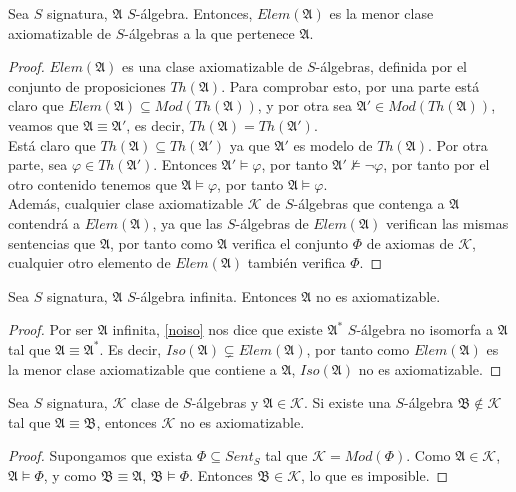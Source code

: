 \begin{theorem}
Sea $S$ signatura, $\mathfrak{A}$ $S$-álgebra. Entonces, $Elem(\mathfrak{A})$ es la menor clase axiomatizable de $S$-álgebras a la que pertenece $\mathfrak{A}$.
\end{theorem}
\begin{proof}
$Elem(\mathfrak{A})$ es una clase axiomatizable de $S$-álgebras, definida por el conjunto de proposiciones $Th(\mathfrak{A})$. Para comprobar esto, por una parte está claro que $Elem(\mathfrak{A})\subseteq Mod(Th(\mathfrak{A}))$, y por otra sea $\mathfrak{A}'\in Mod(Th(\mathfrak{A}))$, veamos que $\mathfrak{A}\equiv\mathfrak{A}'$, es decir, $Th(\mathfrak{A})=Th(\mathfrak{A}')$.\\


Está claro que $Th(\mathfrak{A})\subseteq Th(\mathfrak{A}')$ ya que $\mathfrak{A}'$  es modelo de $Th(\mathfrak{A})$. Por otra  parte, sea $\varphi\in Th(\mathfrak{A}')$. Entonces $\mathfrak{A}'\vDash\varphi$, por tanto $\mathfrak{A}'\nvDash\neg\varphi$, por tanto por el  otro contenido tenemos que $\mathfrak{A}\vDash\varphi$, por tanto $\mathfrak{A}\vDash\varphi$.\\

Además, cualquier clase axiomatizable $\mathcal{K}$ de $S$-álgebras que contenga a  $\mathfrak{A}$ contendrá a $Elem(\mathfrak{A})$, ya que las $S$-álgebras de $Elem(\mathfrak{A})$ verifican las mismas sentencias que $\mathfrak{A}$, por tanto como $\mathfrak{A}$ verifica el conjunto  $\Phi$ de axiomas de $\mathcal{K}$, cualquier otro elemento de $Elem(\mathfrak{A})$ también verifica $\Phi$.
\end{proof}


\begin{cor}
Sea $S$ signatura, $\mathfrak{A}$ $S$-álgebra infinita. Entonces $\mathfrak{A}$ no es axiomatizable. 
\end{cor}
\begin{proof}
Por ser $\mathfrak{A}$ infinita, \ref{noiso} nos dice que existe $\mathfrak{A}^{*}$ $S$-álgebra no isomorfa a $\mathfrak{A}$ tal que $\mathfrak{A} \equiv \mathfrak{A}^{*}$. Es decir, $Iso(\mathfrak{A}) \subsetneq Elem(\mathfrak{A})$, por tanto como $Elem(\mathfrak{A})$ es la menor clase axiomatizable que contiene a $\mathfrak{A}$, $Iso(\mathfrak{A})$ no es axiomatizable.
\end{proof}

\begin{prop}
Sea $S$ signatura, $\mathcal{K}$ clase de $S$-álgebras y $\mathfrak{A} \in \mathcal{K}$. Si existe una $S$-álgebra $\mathfrak{B} \notin \mathcal{K}$ tal que $\mathfrak{A} \equiv \mathfrak{B}$, entonces $\mathcal{K}$ no es axiomatizable.
\end{prop}
\begin{proof}
Supongamos que exista $\Phi \subseteq Sent_S$ tal que $\mathcal{K} = Mod(\Phi)$. Como $\mathfrak{A} \in \mathcal{K}$, $\mathfrak{A}\vDash \Phi$, y como $\mathfrak{B} \equiv \mathfrak{A}$, $\mathfrak{B} \vDash \Phi$. Entonces $\mathfrak{B} \in \mathcal{K}$, lo que es imposible.
\end{proof}

